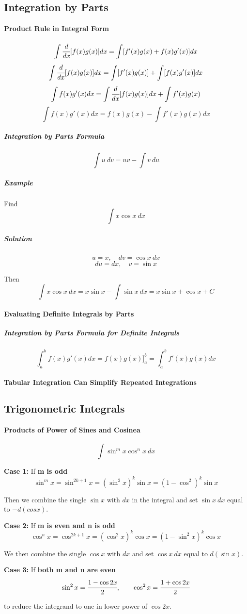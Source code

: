 \documentclass{article}
\begin{document}
        \subsection{Integration by Parts}
            \paragraph{Product Rule in Integral Form}
            \[\int \cfrac{d}{dx}[f(x)g(x)]dx=\int[f'(x)g(x)+f(x)g'(x)]dx\]
            \[\int \cfrac{d}{dx}[f(x)g(x)]dx=\int[f'(x)g(x)]+\int[f(x)g'(x)]dx\]
            \[\int f(x)g'(x)dx=\int \cfrac{d}{dx}[f(x)g(x)]dx+\int f'(x)g(x)\]
            \[\int f(x)g'(x)dx=f(x)g(x)-\int f'(x)g(x)dx\]
            \subparagraph{Integration by Parts Formula}
            \[\int u\ dv=uv-\int v\ du\]
                \subparagraph{Example} Find
                \[\int x\cos x\ dx\]
                \subparagraph{Solution}
                    \[u=x,\quad dv=\cos x\ dx\]
                    \[du=dx,\quad v=\sin x\]
                \par Then
                    \[\int x\cos x\ dx=x\sin x-\int \sin x\ dx=x\sin x+\cos x+C\]
            \paragraph{Evaluating Definite Integrals by Parts}
                \subparagraph{Integration by Parts Formula for Definite Integrals}
                \[\int_a^bf(x)g'(x)dx=f(x)g(x)\Bigg]_a^b=\int_a^bf'(x)g(x)dx\]
            \paragraph{Tabular Integration Can Simplify Repeated Integrations}
        \subsection{Trigonometric Integrals}
            \paragraph{Products of Power of Sines and Cosinea}
            \[\int \sin^mx\cos^nx\ dx\]
            \par \textbf{Case 1: }If \textbf{m is odd}
            \[\sin^mx=\sin^{2k+1}x=(\sin^2x)^k \sin x=(1-\cos^2)^k\sin x\]
            \par Then we combine the single $\sin x$ with $dx$ in the integral and set $\sin x\ dx$ equal to $-d(cosx)$.\\
            \par \textbf{Case 2: }If \textbf{m is even and n is odd}
            \[\cos^nx=\cos^{2k+1}x=(\cos^2x)^k\cos x=(1-\sin^2x)^k\cos x\]
            \par We then combine the single $\cos x$ with $dx$ and set $\cos x\ dx$ equal to $d(\sin x).$
            \\
            \par \textbf{Case 3: }If \textbf{both m and n are even}
            \[\sin^2x=\cfrac{1-\cos 2x}{2},\qquad\cos^2x=\cfrac{1+\cos 2x}{2} \]
            \par to reduce the integrand to one in lower power of $\cos 2x.$
\end{document}
